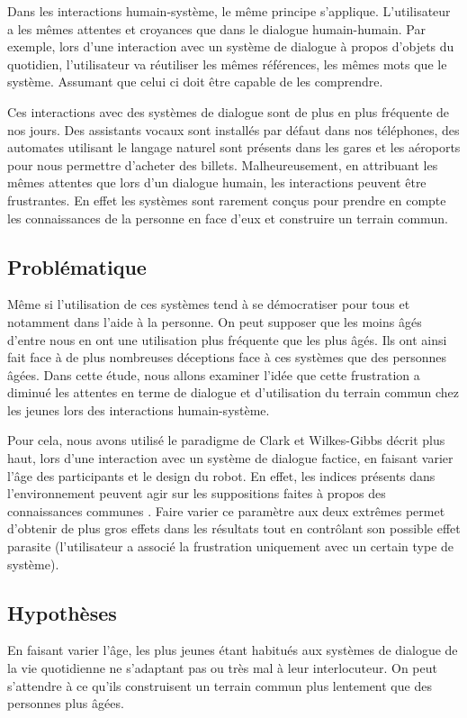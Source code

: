 \documentclass{article}
\begin{document}
Dans les interactions humain-système, le même principe s'applique. L'utilisateur a les mêmes attentes et croyances que dans le dialogue humain-humain. Par exemple, lors d'une interaction avec un système de dialogue à propos d'objets du quotidien, l'utilisateur va réutiliser les mêmes références, les mêmes mots que le système. Assumant que celui ci doit être capable de les comprendre. 

Ces interactions avec des systèmes de dialogue sont de plus en plus fréquente de nos jours. Des assistants vocaux sont installés par défaut dans nos téléphones, des automates utilisant le langage naturel sont présents dans les gares et les aéroports pour nous permettre d'acheter des billets. Malheureusement, en attribuant les mêmes attentes que lors d'un dialogue humain, les interactions peuvent être frustrantes. En effet les systèmes sont rarement conçus pour prendre en compte les connaissances de la personne en face d'eux et construire un terrain commun. 

\subsection{Problématique}
Même si l'utilisation de ces systèmes tend à se démocratiser pour tous et notamment dans l'aide à la personne. On peut supposer que les moins âgés d'entre nous en ont une utilisation plus fréquente que les plus âgés. Ils ont ainsi fait face à de plus nombreuses déceptions face à ces systèmes que des personnes âgées. Dans cette étude, nous allons examiner l'idée que cette frustration a diminué les attentes en terme de dialogue et d'utilisation du terrain commun chez les jeunes lors des interactions humain-système. 

Pour cela, nous avons utilisé le paradigme de Clark et Wilkes-Gibbs décrit plus haut, lors d'une interaction avec un système de dialogue factice, en faisant varier l'âge des participants et le design du robot. En effet, les indices présents dans l'environnement peuvent agir sur les suppositions faites à propos des connaissances communes \cite{PowersRobot}. Faire varier ce paramètre aux deux extrêmes permet d'obtenir de plus gros effets dans les résultats tout en contrôlant son possible effet parasite (l'utilisateur a associé la frustration uniquement avec un certain type de système).

\subsection{Hypothèses} \hypertarget{HP}{} %
En faisant varier l'âge, les plus jeunes étant habitués aux systèmes de dialogue de la vie quotidienne ne s'adaptant pas ou très mal à leur interlocuteur. On peut s'attendre à ce qu'ils construisent un terrain commun plus lentement que des personnes plus âgées.
\end{document}
